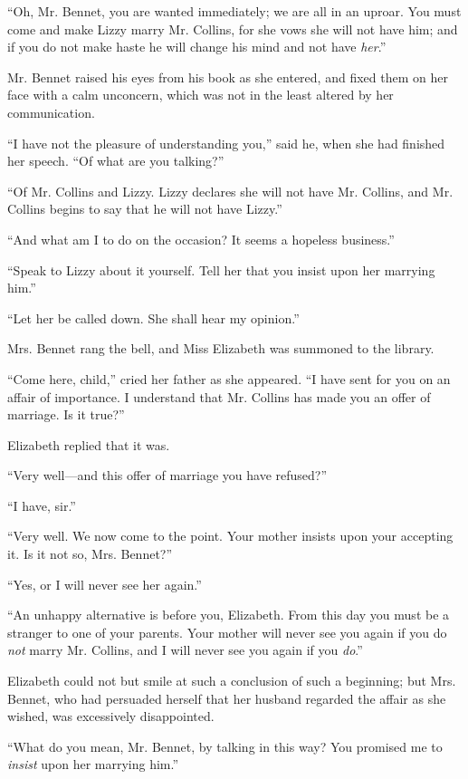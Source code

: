 \documentclass[12pt]{book}
\begin{document}
``Oh, Mr. Bennet, you are wanted immediately; we are all in an uproar. You must come and make Lizzy marry Mr. Collins, for she vows she will not have him; and if you do not make haste he will change his mind and not have \textit{her}.''

Mr. Bennet raised his eyes from his book as she entered, and fixed them on her face with a calm unconcern, which was not in the least altered by her communication.

``I have not the pleasure of understanding you,'' said he, when she had finished her speech. ``Of what are you talking?''

``Of Mr. Collins and Lizzy. Lizzy declares she will not have Mr. Collins, and Mr. Collins begins to say that he will not have Lizzy.''

``And what am I to do on the occasion? It seems a hopeless business.''

``Speak to Lizzy about it yourself. Tell her that you insist upon her marrying him.''

``Let her be called down. She shall hear my opinion.''

Mrs. Bennet rang the bell, and Miss Elizabeth was summoned to the library.

``Come here, child,'' cried her father as she appeared. ``I have sent for you on an affair of importance. I understand that Mr. Collins has made you an offer of marriage. Is it true?''

Elizabeth replied that it was.

``Very well---and this offer of marriage you have refused?''

``I have, sir.''

``Very well. We now come to the point. Your mother insists upon your accepting it. Is it not so, Mrs. Bennet?''

``Yes, or I will never see her again.''

``An unhappy alternative is before you, Elizabeth. From this day you must be a stranger to one of your parents. Your mother will never see you again if you do \textit{not} marry Mr. Collins, and I will never see you again if you \textit{do}.''

Elizabeth could not but smile at such a conclusion of such a beginning; but Mrs. Bennet, who had persuaded herself that her husband regarded the affair as she wished, was excessively disappointed.

``What do you mean, Mr. Bennet, by talking in this way? You promised me to \textit{insist} upon her marrying him.''
\end{document}
